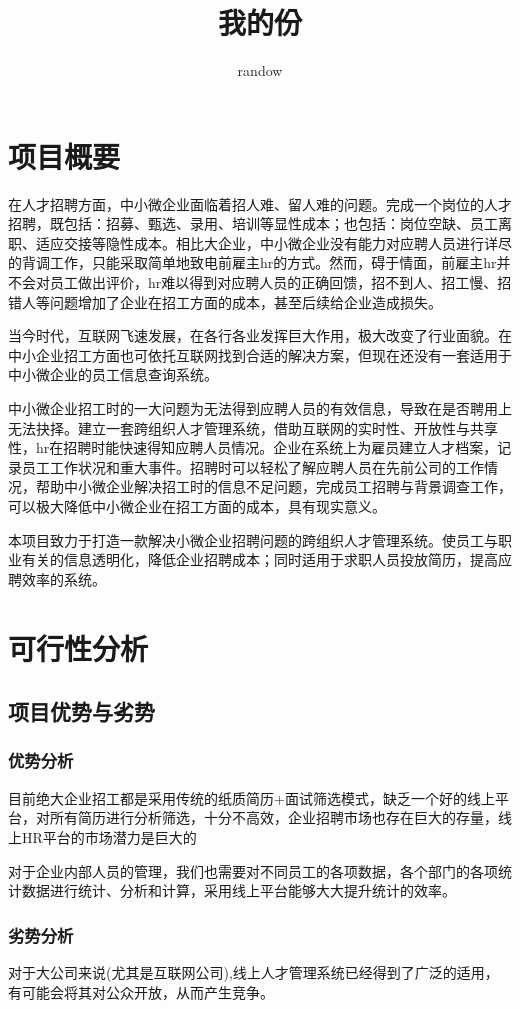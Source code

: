 \documentclass[UTF8]{ctexart}
\title{我的份}
\author{randow}
\begin{document}
\maketitle
\tableofcontents
\newpage
\section{项目概要}
在人才招聘方面，中小微企业面临着招人难、留人难的问题。完成一个岗位的人才招聘，既包括：招募、甄选、录用、培训等显性成本；也包括：岗位空缺、员工离职、适应交接等隐性成本。相比大企业，中小微企业没有能力对应聘人员进行详尽的背调工作，只能采取简单地致电前雇主hr的方式。然而，碍于情面，前雇主hr并不会对员工做出评价，hr难以得到对应聘人员的正确回馈，招不到人、招工慢、招错人等问题增加了企业在招工方面的成本，甚至后续给企业造成损失。

当今时代，互联网飞速发展，在各行各业发挥巨大作用，极大改变了行业面貌。在中小企业招工方面也可依托互联网找到合适的解决方案，但现在还没有一套适用于中小微企业的员工信息查询系统。

中小微企业招工时的一大问题为无法得到应聘人员的有效信息，导致在是否聘用上无法抉择。建立一套跨组织人才管理系统，借助互联网的实时性、开放性与共享性，hr在招聘时能快速得知应聘人员情况。企业在系统上为雇员建立人才档案，记录员工工作状况和重大事件。招聘时可以轻松了解应聘人员在先前公司的工作情况，帮助中小微企业解决招工时的信息不足问题，完成员工招聘与背景调查工作，可以极大降低中小微企业在招工方面的成本，具有现实意义。

本项目致力于打造一款解决小微企业招聘问题的跨组织人才管理系统。使员工与职业有关的信息透明化，降低企业招聘成本；同时适用于求职人员投放简历，提高应聘效率的系统。
\section{可行性分析}
\subsection{项目优势与劣势}
\subsubsection{优势分析}
目前绝大企业招工都是采用传统的纸质简历+面试筛选模式，缺乏一个好的线上平台，对所有简历进行分析筛选，十分不高效，企业招聘市场也存在巨大的存量，线上HR平台的市场潜力是巨大的

对于企业内部人员的管理，我们也需要对不同员工的各项数据，各个部门的各项统计数据进行统计、分析和计算，采用线上平台能够大大提升统计的效率。
\subsubsection{劣势分析}
对于大公司来说(尤其是互联网公司),线上人才管理系统已经得到了广泛的适用，有可能会将其对公众开放，从而产生竞争。
\end{document}
